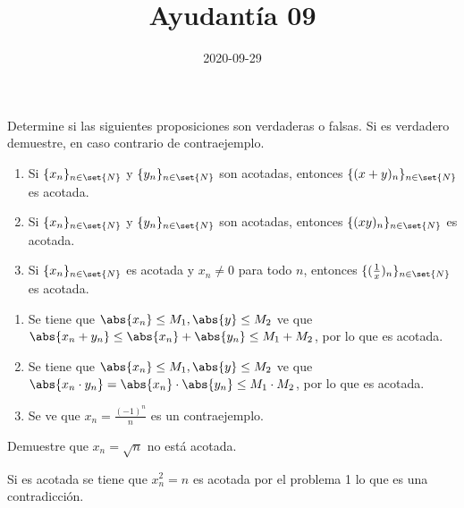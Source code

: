 \documentclass{ayudantia}
\title{Ayudantía 09}
\date{2020-09-29}
\begin{document}
\maketitle

\begin{prob}
    Determine si las siguientes proposiciones son verdaderas o falsas. Si es verdadero demuestre, en caso contrario de contraejemplo.
    \begin{enumerate}[label=(\alph*)]
        \item Si \(\{x_n\}_{n\in\set{N}}\) y \(\{y_n\}_{n\in\set{N}}\) son acotadas, entonces \(\{(x+y)_n\}_{n\in\set{N}}\) es acotada.
        \item Si \(\{x_n\}_{n\in\set{N}}\) y \(\{y_n\}_{n\in\set{N}}\) son acotadas, entonces \(\{(xy)_n\}_{n\in\set{N}}\) es acotada.
        \item Si \(\{x_n\}_{n\in\set{N}}\) es acotada y \(x_n\neq0\) para todo \(n\), entonces \(\{(\frac1x)_n\}_{n\in\set{N}}\) es acotada.
    \end{enumerate}
\end{prob}

\begin{ans}
    \begin{sol}
        \begin{enumerate}[label=(\alph*)]
            \item Se tiene que \(\abs{x_n}\leq M_1,\abs{y}\leq M_2\) ve que \(\abs{x_n+y_n}\leq\abs{x_n}+\abs{y_n}\leq M_1+M_2\), por lo que es acotada.
            \item Se tiene que \(\abs{x_n}\leq M_1,\abs{y}\leq M_2\) ve que \(\abs{x_n\cdot y_n}=\abs{x_n}\cdot\abs{y_n}\leq M_1\cdot M_2\), por lo que es acotada.
            \item Se ve que \(x_n=\frac{(-1)^n}n\) es un contraejemplo.
        \end{enumerate}
    \end{sol}
\end{ans}


\begin{prob}
    Demuestre que \(x_n=\sqrt{n}\) no está acotada.
\end{prob}

\begin{ans}
    \begin{sol}
        Si es acotada se tiene que \(x^2_n=n\) es acotada por el problema 1 lo que es una contradicción.
    \end{sol}
\end{ans}
\end{document}
